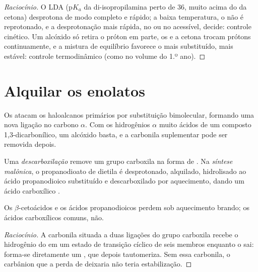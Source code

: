 \begin{proof}[Raciocínio]
O LDA ($\mathrm pK_a$ da di-isopropilamina perto de 36, muito acima do da cetona) desprotona de
modo completo e rápido; a baixa temperatura, o  não é reprotonado, e a desprotonação mais
rápida, no  ou no  acessível, decide: controle cinético. Um alcóxido só retira o próton
em parte, os  e a cetona trocam prótons continuamente, e a mistura de equilíbrio favorece o
 mais substituído, mais estável: controle termodinâmico (como no volume do 1.º ano).
\end{proof}

\section{Alquilar os enolatos}

Os  atacam os haloalcanos primários por substituição bimolecular, formando uma nova ligação
 no carbono $\alpha$. Com os hidrogênios $\alpha$ muito ácidos de um composto 1,3-dicarbonílico,
um alcóxido basta, e a carbonila suplementar pode ser removida depois.

\begin{definition}[Descarboxilação]\label{def:b2:enolates-aldol:decarboxylation}
Uma \emph{descarboxilação} remove um grupo carboxila na forma de . Na
\emph{síntese malônica}, o propanodioato de dietila é desprotonado,
alquilado, hidrolisado ao ácido propanodioico substituído e descarboxilado por aquecimento, dando
um ácido carboxílico .
\end{definition}

\begin{proposition}\label{prop:b2:enolates-aldol:decarboxylation}
Os $\beta$-cetoácidos e os ácidos propanodioicos perdem  sob aquecimento brando; os ácidos
carboxílicos comuns, não.
\end{proposition}

\begin{proof}[Raciocínio]
A carbonila situada a duas ligações do grupo carboxila recebe o hidrogênio do  em um estado
de transição cíclico de seis membros enquanto o  sai: forma-se diretamente um , que depois
tautomeriza. Sem essa carbonila, o carbânion que a perda de  deixaria não teria estabilização.
\end{proof}

